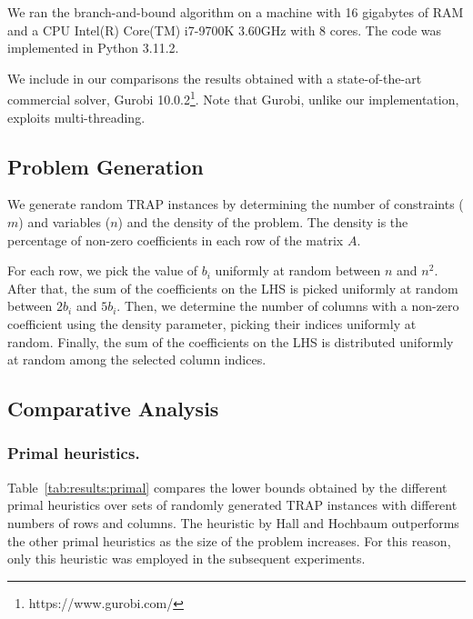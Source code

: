 \documentclass[runningheads]{llncs}
\begin{document}
We ran the branch-and-bound algorithm on a machine with 16 gigabytes of RAM and a CPU Intel(R) Core(TM) i7-9700K 3.60GHz with 8 cores. The code was implemented in Python 3.11.2.

We include in our comparisons the results obtained with a state-of-the-art commercial solver, Gurobi 10.0.2\footnote{https://www.gurobi.com/}. Note that Gurobi, unlike our implementation, exploits multi-threading. 


\subsection{Problem Generation}
\label{subsec:results:generation}

We generate random TRAP instances by determining the number of constraints ($m$) and variables ($n$) and the density of the problem. The density is the percentage of non-zero coefficients in each row of the matrix $A$.

For each row, we pick the value of $b_i$ uniformly at random between $n$ and $n^2$. After that, the sum of the coefficients on the LHS is picked uniformly at random between $2b_i$ and $5b_i$. Then, we determine the number of columns with a non-zero coefficient using the density parameter, picking their indices uniformly at random. Finally, the sum of the coefficients on the LHS is distributed uniformly at random among the selected column indices.

\subsection{Comparative Analysis}
\label{subsec:results:comparisons}

\subsubsection{Primal heuristics.} Table~\ref{tab:results:primal} compares the lower bounds obtained by the different primal heuristics over sets of randomly generated TRAP instances with different numbers of rows and columns. The heuristic by Hall and Hochbaum outperforms the other primal heuristics as the size of the problem increases. For this reason, only this heuristic was employed in the subsequent experiments. 
\end{document}
